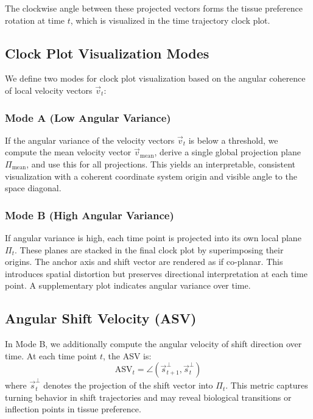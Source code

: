 \documentclass{article}
\begin{document}
The clockwise angle between these projected vectors forms the tissue preference rotation at time \( t \), which is visualized in the time trajectory clock plot.

\subsection{Clock Plot Visualization Modes}

We define two modes for clock plot visualization based on the angular coherence of local velocity vectors \( \vec{v}_t \):

\subsubsection*{Mode A (Low Angular Variance)}

If the angular variance of the velocity vectors \( \vec{v}_t \) is below a threshold, we compute the mean velocity vector \( \vec{v}_{\text{mean}} \), derive a single global projection plane \( \Pi_{\text{mean}} \), and use this for all projections. This yields an interpretable, consistent visualization with a coherent coordinate system origin and visible angle to the space diagonal.

\subsubsection*{Mode B (High Angular Variance)}

If angular variance is high, each time point is projected into its own local plane \( \Pi_t \). These planes are stacked in the final clock plot by superimposing their origins. The anchor axis and shift vector are rendered as if co-planar. This introduces spatial distortion but preserves directional interpretation at each time point. A supplementary plot indicates angular variance over time.

\subsection{Angular Shift Velocity (ASV)}

In Mode B, we additionally compute the angular velocity of shift direction over time. At each time point \( t \), the ASV is:
\[
\text{ASV}_t = \angle\left( \vec{s}_{t+1}^{\perp}, \vec{s}_t^{\perp} \right)
\]
where \( \vec{s}_t^{\perp} \) denotes the projection of the shift vector into \( \Pi_t \). This metric captures turning behavior in shift trajectories and may reveal biological transitions or inflection points in tissue preference.
\end{document}

